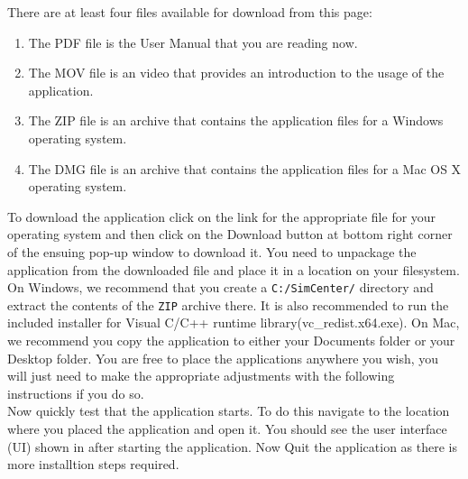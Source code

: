 

There are at least four files available for download from this page: 
\begin{enumerate}
    \item The PDF file is the User Manual that you are reading now.
    \item The MOV file is an video that provides an introduction to the usage of the application.
    \item The ZIP file is an archive that contains the application files for a Windows operating system.
    \item The DMG file is an archive that contains the application files for a Mac OS X operating system.
\end{enumerate}

To download the \texttt{\getsoftwarename{}} application click on the link for
the appropriate file for your operating system and then click on the
Download button at bottom right corner of the ensuing pop-up window to
download it. You need to unpackage the application from the downloaded
file and place it in a location on your filesystem. On Windows, we
recommend that you create a \texttt{C:/SimCenter/\getsoftwarename{}}
directory and extract the contents of the \texttt{ZIP} archive
there. It is also recommended to run the included installer for Visual C/C++ runtime library(vc\_redist.x64.exe). On Mac, we recommend you copy the application to either your
Documents folder or your Desktop folder. You are free to place the
applications anywhere you wish, you will just need to make the
appropriate adjustments with the following instructions if you do so. \\

Now quickly test that the application starts. To do this navigate to
the location where you placed the application and open it. You should
see the user interface (UI) shown in  after
starting the application. Now Quit the application as there is more installtion steps required.\\

